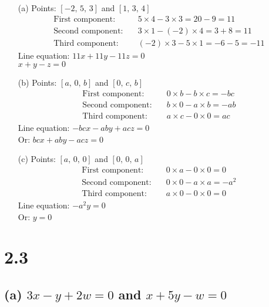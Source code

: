 \documentclass[12pt]{article}
\begin{document}
\begin{enumerate}
    \item[(a)] Points: $[-2,\, 5,\, 3]$ and $[1,\, 3,\, 4]$
    \begin{align*}
        \text{First component:} &\quad 5 \times 4 - 3 \times 3 = 20 - 9 = 11 \\
        \text{Second component:} &\quad 3 \times 1 - (-2) \times 4 = 3 + 8 = 11 \\
        \text{Third component:} &\quad (-2) \times 3 - 5 \times 1 = -6 - 5 = -11
    \end{align*}
    Line equation: $11x + 11y - 11z = 0$ \\
     $x + y - z = 0$

    \item[(b)] Points: $[a,\, 0,\, b]$ and $[0,\, c,\, b]$
    \begin{align*}
        \text{First component:} &\quad 0 \times b - b \times c = -bc \\
        \text{Second component:} &\quad b \times 0 - a \times b = -ab \\
        \text{Third component:} &\quad a \times c - 0 \times 0 = ac
    \end{align*}
    Line equation: $-bcx - aby + acz = 0$ \\
    Or: $bcx + aby - acz = 0$

    \item[(c)] Points: $[a,\, 0,\, 0]$ and $[0,\, 0,\, a]$
    \begin{align*}
        \text{First component:} &\quad 0 \times a - 0 \times 0 = 0 \\
        \text{Second component:} &\quad 0 \times 0 - a \times a = -a^2 \\
        \text{Third component:} &\quad a \times 0 - 0 \times 0 = 0
    \end{align*}
    Line equation: $-a^2y = 0$ \\
    Or: $y = 0$
\end{enumerate}

\section*{2.3}

\subsection*{(a) $3x - y + 2w = 0$ and $x + 5y - w = 0$}
\end{document}
